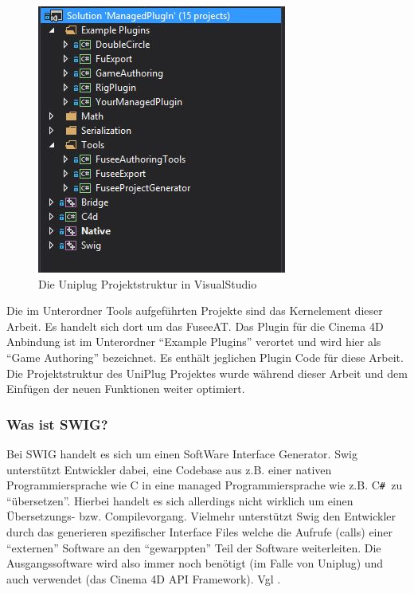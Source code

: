 \documentclass[pagesize, paper=a4, fontsize=12pt, titlepage=true, headings=small, headnosepline, abstractoff, liststotoc, nochapterprefix, plainheadsepline, twoside]{scrreprt}
\newcommand{\CSS}{C\texttt{\# }}
\newcommand{\CPPS}{C\nolinebreak\hspace{-.05em}\raisebox{.4ex}{\tiny\bf +}\nolinebreak\hspace{-.10em}\raisebox{.4ex}{\tiny\bf +} }
\begin{document}
\begin{figure}[ht]
	\centering
  \includegraphics[width=\linewidth / 2]{Bilder/UniplugVSStruktur.JPG}
	\caption{Die Uniplug Projektstruktur in VisualStudio}
	\label{UniPlugVSStruktur}
\end{figure}
Die im Unterordner Tools aufgeführten Projekte sind das Kernelement dieser Arbeit. Es handelt sich dort um das FuseeAT. Das Plugin für die Cinema 4D Anbindung ist im Unterordner “Example Plugins” verortet und wird hier als “Game Authoring” bezeichnet. Es enthält jeglichen Plugin Code für diese Arbeit. Die Projektstruktur des UniPlug Projektes wurde während dieser Arbeit und dem Einfügen der neuen Funktionen weiter optimiert.

\subsubsection{Was ist SWIG?}
Bei SWIG handelt es sich um einen SoftWare Interface Generator. Swig unterstützt Entwickler dabei, eine Codebase aus z.B. einer nativen Programmiersprache wie \CPPS in eine managed Programmiersprache wie z.B. \CSS zu “übersetzen”. Hierbei handelt es sich allerdings nicht wirklich um einen Übersetzungs- bzw. Compilevorgang. Vielmehr unterstützt Swig den Entwickler durch das generieren spezifischer Interface Files welche die Aufrufe (calls) einer “externen” Software an den “gewarppten” Teil der Software weiterleiten. Die Ausgangssoftware wird also immer noch benötigt (im Falle von Uniplug) und auch verwendet (das Cinema 4D API Framework). Vgl .
\end{document}
